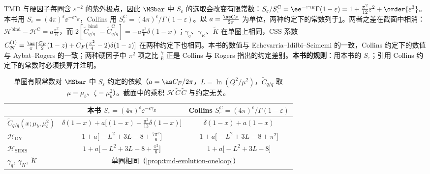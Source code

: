 \begin{remark}\label{rem:tmd-scheme-constants}
TMD 与硬因子每圈含 $\varepsilon^{-2}$ 的紫外极点，因此 $\MSbar$ 中 $S_\varepsilon$ 的选取会改变有限常数：$S_\varepsilon/S^{\mathrm C}_\varepsilon=\ee^{-\varepsilon\gamma_E}\Gamma(1-\varepsilon)=1+\frac{\pi^2}{12}\varepsilon^2+\order{\varepsilon^3}$。本书用 $S_\varepsilon=(4\pi)^\varepsilon\ee^{-\varepsilon\gamma_E}$，Collins 用 $S^{\mathrm C}_\varepsilon=(4\pi)^\varepsilon/\Gamma(1-\varepsilon)$\cite{Collins2011}。以 $a=\frac{\as C_F}{2\pi}$ 为单位，两种约定下的常数列于\cref{tab:tmd-scheme-constants}。两者之差在截面中相消：$\mathcal H^{\mathrm{bind}}-\mathcal H^{\mathrm C}=a\frac{\pi^2}{6}$，而 $2[\tilde C^{\mathrm{bind}}_{q/q}-\tilde C^{\mathrm C}_{q/q}]=-a\frac{\pi^2}{6}\delta(1-x)$；$\gamma_q$、$\gamma_K$、$\tilde K$ 在单圈上相同，CSS 系数 $C^{(1)}_{qq}=\frac{\as}{\pi}[\frac{C_F}{2}(1-z)+C_F(\frac{\pi^2}{4}-2)\delta(1-z)]$ 在两种约定下也相同。本书的数值与 Echevarria--Idilbi--Scimemi 的一致，Collins 约定下的数值与 Aybat--Rogers 的一致\cite{EchevarriaIdilbiScimemi2012,AybatRogers2011}；两种硬因子中 $\pi^2$ 项之比 $\frac76$ 正是 Collins 与 Rogers 指出的约定差别\cite{Collins:2012uy}。\textbf{本书的规则}：用本书的 $S_\varepsilon$；引用 Collins 约定下的常数时必须换算并注明。
\end{remark}

\begin{table}[htbp]
\centering
\caption{单圈有限常数对 $\MSbar$ 中 $S_\varepsilon$ 约定的依赖（$a=\as C_F/2\pi$，$L=\ln(Q^2/\mu^2)$，$\tilde C_{q/q}$ 取 $\mu=\mu_b$、$\zeta=\mu_b^2$）。截面中的乘积 $\mathcal H\,\tilde C\,\tilde C$ 与约定无关。}
\label{tab:tmd-scheme-constants}
\small
\begin{tabular}{@{}lcc@{}}
\toprule
 & 本书 $S_\varepsilon=(4\pi)^\varepsilon\ee^{-\varepsilon\gamma_E}$ & Collins $S^{\mathrm C}_\varepsilon=(4\pi)^\varepsilon/\Gamma(1-\varepsilon)$\\
\midrule
$\tilde C_{q/q}(x;\mu_b,\mu_b^2)$ & $\delta(1-x)+a\big[(1-x)-\frac{\pi^2}{12}\delta(1-x)\big]$ & $\delta(1-x)+a(1-x)$\\
$\mathcal H_{\mathrm{DY}}$ & $1+a\big[-L^2+3L-8+\frac{7\pi^2}{6}\big]$ & $1+a\big[-L^2+3L-8+\pi^2\big]$\\
$\mathcal H_{\mathrm{SIDIS}}$ & $1+a\big[-L^2+3L-8+\frac{\pi^2}{6}\big]$ & $1+a\big[-L^2+3L-8\big]$\\
$\gamma_q,\ \gamma_K,\ \tilde K$ & \multicolumn{2}{c}{单圈相同（\cref{prop:tmd-evolution-oneloop}）}\\
\bottomrule
\end{tabular}
\end{table}
